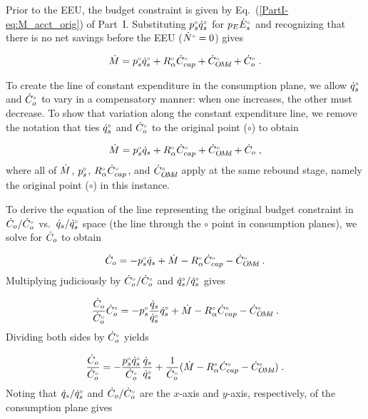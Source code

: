 Prior to the EEU, the budget constraint is given by Eq.~(\ref{PartI-eq:M_acct_orig}) of Part~I.
Substituting $\orig{p}_s \rorig{q}_s$ for $p_E \rorig{E}_s$ and 
recognizing that there is no net savings before the EEU
($\rorig{N} = 0$) gives

\begin{equation}
  \rate{M} = \orig{p}_s \rorig{q}_s + \orig{R}_\alpha \rorig{C}_{cap} + \rorig{C}_{\omd} + \rorig{C}_o \; .
\end{equation}

To create the line of constant expenditure in the consumption plane, 
we allow $\rorig{q}_s$ and $\rorig{C}_o$ to vary in a compensatory manner:
when one increases, the other must decrease.
To show that variation along the constant expenditure line, 
we remove the notation that ties $\rorig{q}_s$ and $\rorig{C}_o$
to the original point ($\circ$) to obtain

\begin{equation}
  \rate{M} = \bempl{p}_s \rate{q}_s + \bempl{R}_\alpha \rbempl{C}_{cap} + \rbempl{C}_{\omd} + \rate{C}_o \; , 
\end{equation}
%
where all of $\rate{M}$, $\bempl{p}_s$, $\bempl{R}_\alpha \rbempl{C}_{cap}$, and $\rbempl{C}_{\omd}$
apply at the same rebound stage, 
namely the original point ($\circ$) in this instance.

To derive the equation of the line representing the original budget constraint 
in $\rate{C}_o/\rbempl{C}_o$ vs.\ $\rate{q}_s/\rbempl{q}_s$ space
(the \circcirc{} line through the $\circ$ point
in consumption planes), 
we solve for $\rate{C}_o$ to obtain

\begin{equation}
  \rate{C}_o = - \bempl{p}_s \rate{q}_s + \rate{M} - \bempl{R}_\alpha \rbempl{C}_{cap} - \rbempl{C}_{\omd} \; .
\end{equation}
%
Multiplying judiciously by $\rbempl{C}_o/\rbempl{C}_o$ and $\rbempl{q}_s/\rbempl{q}_s$ gives

\begin{equation}
  \frac{\rate{C}_o}{\rbempl{C}_o} \rbempl{C}_o
       = - \bempl{p}_s \frac{\rate{q}_s}{\rbempl{q}_s} \rbempl{q}_s 
         + \rate{M} - \bempl{R}_\alpha \rbempl{C}_{cap} - \rbempl{C}_{\omd} \; .
\end{equation}
%
Dividing both sides by $\rbempl{C}_o$ yields

\begin{equation}
  \frac{\rate{C}_o}{\rbempl{C}_o}
       = - \frac{\bempl{p}_s \rbempl{q}_s}{\rbempl{C}_o} \frac{\rate{q}_s}{\rbempl{q}_s}
         + \frac{1}{\rbempl{C}_o} (\rate{M} - \bempl{R}_\alpha \rbempl{C}_{cap} - \rbempl{C}_{\omd}) \; .
\end{equation}
%
Noting that  
$\rate{q}_s/\rbempl{q}_s$ and 
$\rate{C}_o/\rbempl{C}_o$ are
the $x$-axis and $y$-axis, respectively,
of the consumption plane gives

